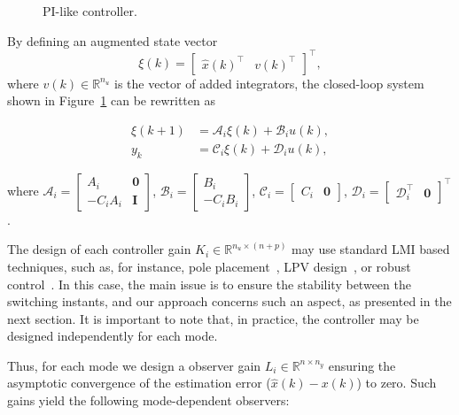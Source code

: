 \begin{figure}[!htb]
	\centering
	\resizebox{0.98\linewidth}{!}{}
	\caption{PI-like controller.}%
	\label{fig:pi-controller-diagram}
\end{figure}

By defining an augmented state vector
\[
	\xi(k)=\begin{bmatrix}{\hat{x}(k)}^\top &v{(k)}^\top\end{bmatrix}^\top,
\]
where \(v(k)\in\mathbb{R}^{n_u}\) is the vector of added integrators, the
closed-loop system shown in Figure~\ref{fig:pi-controller-diagram} can be
rewritten as

\begin{equation}
	\label{sistemaaum}
	\begin{split}
		\xi(k+1) &= \mathcal{A}_i\xi(k)+\mathcal{B}_{i}u(k), \\
		y_{k}    &= \mathcal{C}_i\xi(k)+\mathcal{D}_{i}u(k),
	\end{split}
\end{equation}

where \(\mathcal{A}_i=\begin{bmatrix}A_i & \textbf{0} \\-C_{i}A_i&\textbf{I}
\end{bmatrix} \), \(\mathcal{B}_i=\begin{bmatrix}B_i\\-C_{i}B_i\end{bmatrix}\),
\(\mathcal{C}_i=\begin{bmatrix} C_i & \textbf{0} \end{bmatrix}\),
\(\mathcal{D}_i=\begin{bmatrix}\mathcal{D}_i^\top&\textbf{0}\end{bmatrix}^\top\).

The design of each controller gain \(K_i\in\mathbb{R}^{n_u\times{}(n+p)}\) may use
standard LMI based techniques, such as, for instance, pole
placement~\citep{book:yu}, LPV design~\citep{briat2014linear}, or robust
control~\citep{Boyd94}. In this case, the main issue is to ensure the stability
between the switching instants, and our approach concerns such an aspect, as
presented in the next section. It is important to note that, in practice, the
controller may be designed independently for each mode.

Thus, for each mode we design a observer gain \(L_{i}\in\mathbb{R}^{n\times{}n_y}\)
ensuring the asymptotic convergence of the estimation error
(\(\hat{x}(k)-x(k)\)) to zero. Such gains yield the following mode-dependent
observers:

